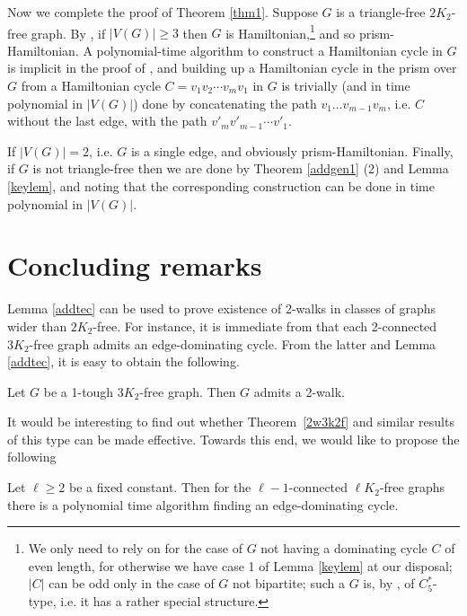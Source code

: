\documentclass{ws-jktr}
\newcommand{\qed}{\prbox}
\begin{document}
Now we complete the proof of Theorem \ref{thm1}.
Suppose $G$ is a triangle-free $2K_2$-free graph. By \cite[Theorem 4]{broersma2014toughness},
if $|V(G)|\geq 3$ then
$G$ is Hamiltonian,\footnote{
We only need to rely on  \cite[Theorem 4]{broersma2014toughness}
for the case of $G$ not having a dominating cycle $C$ of even length, for
otherwise we have case 1 of Lemma \ref{keylem} at our disposal; $|C|$ can be odd
only in the case of $G$ not bipartite; such a $G$ is, by \cite[Lemma 2]{broersma2014toughness},
of $C_5^*$-type, i.e. it has a rather special structure.}
and so prism-Hamiltonian.
A polynomial-time algorithm to construct a Hamiltonian cycle in $G$ is
implicit in the proof of  \cite[Theorem 4]{broersma2014toughness}, and
building up a Hamiltonian cycle in the prism over $G$ from a Hamiltonian
cycle $C=v_1v_2\cdots v_{m}v_1$ in $G$ is trivially (and in time polynomial in $|V(G)|$)
done by concatenating the path $v_1\dots v_{m-1}v_m$, i.e. $C$ without the last edge, with the
path $v'_m v'_{m-1}\cdots v'_1$.

If $|V(G)|=2$, i.e. $G$ is a single edge, and obviously prism-Hamiltonian.
Finally, if $G$ is not triangle-free then we are done by
Theorem \ref{addgen1} (2) and Lemma \ref{keylem}, and noting that the
corresponding construction can be done in  time polynomial in $|V(G)|$.
\qed

\section{Concluding remarks}

Lemma \ref{addtec} can be used to prove existence of 2-walks in
classes of graphs wider than $2K_2$-free.
For instance, it is immediate from \cite[Corollary 3.2]{veldman83} that each 2-connected
$3K_2$-free graph admits  an edge-dominating cycle. From the latter and Lemma \ref{addtec},
it is easy to obtain the following.
\begin{theorem}\label{2w3k2f}
Let $G$ be a 1-tough $3K_2$-free graph. Then $G$ admits a 2-walk. \qed
\end{theorem}

It would be interesting to find out whether Theorem~\ref{2w3k2f} and similar results
of this type can be made
effective. Towards this end, we would like to propose the following
\begin{conjecture}
Let $\ell\geq 2$ be a fixed constant.
Then for the $\ell-1$-connected $\ell K_2$-free
graphs there is a polynomial time algorithm finding an edge-dominating cycle.
\end{conjecture}
\end{document}

